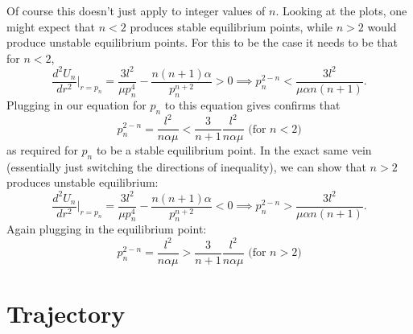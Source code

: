 \documentclass[letterpaper, reqno,11pt]{article}
\begin{document}
Of course this doesn't just apply to integer values of  $n$. Looking at the plots, one might expect that $n<2$ produces stable equilibrium points, while $n>2$ would produce unstable equilibrium points. For this to be the case it needs to be that for $n<2$,  
\[
\frac{d^2U_n}{dr^2}\bigg|_{r=p_n}=\frac{3l^2}{\mu p_n^{4}}-\frac{n(n+1)\alpha}{p_n^{n+2}}>0\implies p_n^{2-n}<\frac{3l^2}{\mu\alpha n (n+1)}
.\]
Plugging in our equation for $p_n$ to this equation gives confirms that 
\[
p_n^{2-n}=\frac{l^2}{n\alpha\mu}< \frac{3}{n+1} \frac{l^2}{n\alpha\mu}  \text{ (for $n<2$)}
\]
as required for $p_n$ to be a stable equilibrium point. In the exact same vein (essentially just switching the directions of inequality), we can show that $n>2$ produces unstable equilibrium: 
\[
\frac{d^2U_n}{dr^2}\bigg|_{r=p_n}=\frac{3l^2}{\mu p_n^{4}}-\frac{n(n+1)\alpha}{p_n^{n+2}}<0\implies p_n^{2-n}>\frac{3l^2}{\mu\alpha n (n+1)}
.\]
Again plugging in the equilibrium point: 
\[
p_n^{2-n}=\frac{l^2}{n\alpha\mu}> \frac{3}{n+1} \frac{l^2}{n\alpha\mu}  \text{ (for $n>2$)}
\]

\section{Trajectory}
\end{document}
